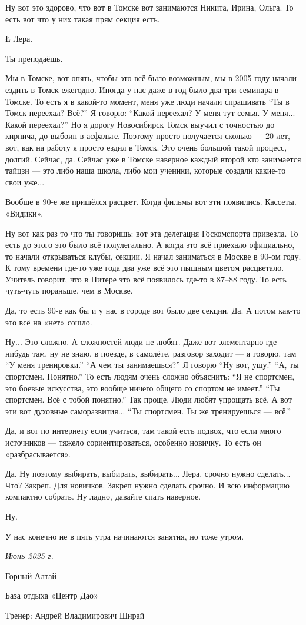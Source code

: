 \I
Ну вот это здорово,
что вот
в Томске вот занимаются
Никита, Ирина, Ольга.
То есть вот
что у них такая прям
секция есть.

\L
Лера.

\N
Ты преподаёшь.

\A
Мы в Томске,
вот опять,
чтобы это всё было возможным,
мы в 2005 году
начали ездить
в Томск
ежегодно.
Иногда у нас даже
в год было
два-три семинара
в Томске.
То есть я
в какой-то момент,
меня уже люди
начали спрашивать
``Ты в Томск переехал?
Всё?''
Я говорю: ``Какой переехал?
У меня тут семья.
У меня...
Какой переехал?''
Но я дорогу
Новосибирск Томск
выучил
с точностью до
кирпича,
до выбоин
в асфальте.
Поэтому
просто
получается
сколько ---
20 лет,
вот,
как на работу
я просто ездил
в Томск.
Это очень большой
такой процесс,
долгий.
Сейчас, да.
Сейчас
уже в Томске
наверное
каждый второй
кто занимается
тайцзи ---
это
либо наша школа,
либо
мои ученики,
которые создали
какие-то свои
уже...

\I
Вообще
в 90-е же
пришёлся
расцвет.
Когда
фильмы
вот эти
появились.
Кассеты.
«Видики».

\A
Ну вот
как раз
то что ты говоришь:
вот эта
делегация
Госкомспорта
привезла.
То есть
до этого
это было
всё полулегально.
А
когда
это всё
приехало
официально,
то начали открываться клубы, секции.
Я начал заниматься в Москве в 90-ом
году.
К тому времени
где-то уже
года два
уже всё это
пышным цветом
расцветало.
Учитель
говорит,
что
в Питере
это всё
появилось
где-то
в 87--88 году.
То есть
чуть-чуть
пораньше,
чем в Москве.

\I
Да,
то есть 90-е
как бы
и у нас
в городе
вот было
две секции.
Да.
А потом
как-то это всё на «нет» сошло.

\A
Ну... Это сложно.
А сложностей люди не любят.
Даже
вот
элементарно
где-нибудь
там,
ну не знаю,
в поезде,
в самолёте,
разговор заходит ---
я говорю, там ``У меня тренировки.''
``А чем ты занимаешься?''
Я говорю ``Ну вот, ушу.''
``А, ты спортсмен. Понятно.''
То есть
людям
очень сложно
объяснить: ``Я не спортсмен,
это боевые искусства,
это вообще ничего общего
со спортом
не имеет.''
``Ты спортсмен. Всё с тобой понятно.''
Так проще. Люди любят упрощать всё.
А вот эти вот
духовные
саморазвития...
``Ты спортсмен.
Ты же тренируешься --- всё.''

\I
Да, и вот
по интернету
если учиться,
там
такой
есть
подвох,
что если
много источников ---
тяжело
сориентироваться,
особенно
новичку.
То есть
он «разбрасывается».

\A
Да.
Ну поэтому
выбирать, выбирать, выбирать...
Лера,
срочно
нужно
сделать...
Что?
Закреп. Для новичков.
Закреп нужно сделать срочно.
И всю
информацию
компактно
собрать.
Ну
ладно,
давайте
спать
наверное.

\I
Ну.

\A
У нас
конечно
не в пять утра
начинаются
занятия,
но
тоже
утром.

\kern2cm
\it
\lineskip=7pt
\hskip6cm Июнь 2025 г. \par
\hskip4cm Горный Алтай \par
\hskip5cm База отдыха «Центр Дао» \par
\kern3cm
\hskip2cm \tensl Тренер: Андрей Владимирович Ширай

\bye
